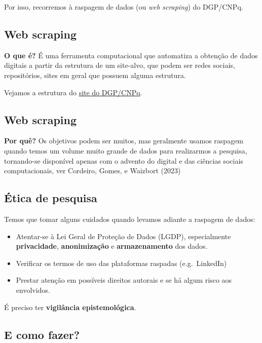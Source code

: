 \documentclass[
  brazilian,
  letterpaper,
  DIV=11,
  numbers=noendperiod]{scrartcl}
\begin{document}
Por isso, recorremos à raspagem de dados (ou \emph{web scraping}) do
DGP/CNPq.

\subsection{Web scraping}\label{web-scraping}

\textbf{O que é?} É uma ferramenta computacional que automatiza a
obtenção de dados digitais a partir da estrutura de um site-alvo, que
podem ser redes sociais, repositórios, sites em geral que possuem alguma
estrutura.

Vejamos a estrutura do \href{https://lattes.cnpq.br/web/dgp}{site do
DGP/CNPq}.

\subsection{Web scraping}\label{web-scraping-1}

\textbf{Por quê?} Os objetivos podem ser muitos, mas geralmente usamos
raspagem quando temos um volume muito grande de dados para realizarmos a
pesquisa, tornando-se disponível apenas com o advento do digital e das
ciências sociais computacionais, ver Cordeiro, Gomes, e Waizbort (2023)

\subsection{Ética de pesquisa}\label{uxe9tica-de-pesquisa}

Temos que tomar alguns cuidados quando levamos adiante a raspagem de
dados:

\begin{itemize}
\item
  Atentar-se à Lei Geral de Proteção de Dados (LGDP), especialmente
  \textbf{privacidade}, \textbf{anonimização} e \textbf{armazenamento}
  dos dados.
\item
  Verificar os termos de uso das plataformas raspadas (e.g.~LinkedIn)
\item
  Prestar atenção em possíveis direitos autorais e se há algum risco aos
  envolvidos.
\end{itemize}

É preciso ter \textbf{vigilância epistemológica}.

\subsection{E como fazer?}\label{e-como-fazer}
\end{document}
